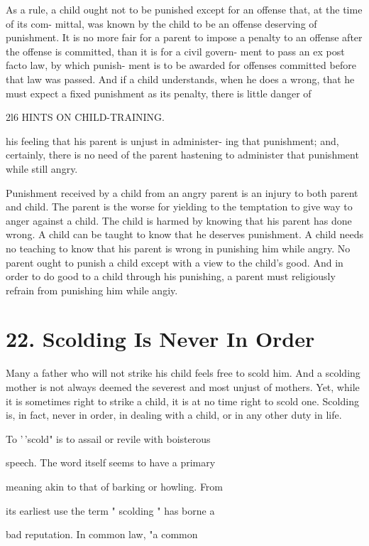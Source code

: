 \documentclass[
]{book}
\begin{document}
As a rule, a child ought not to be punished except for an offense that, at the time of its com- mittal, was known by the child to be an offense deserving of punishment. It is no more fair for a parent to impose a penalty to an offense after the offense is committed, than it is for a civil govern- ment to pass an ex post facto law, by which punish- ment is to be awarded for offenses committed before that law was passed. And if a child understands, when he does a wrong, that he must expect a fixed punishment as its penalty, there is little danger of

2l6 HINTS ON CHILD-TRAINING.

his feeling that his parent is unjust in administer- ing that punishment; and, certainly, there is no need of the parent hastening to administer that punishment while still angry.

Punishment received by a child from an angry parent is an injury to both parent and child. The parent is the worse for yielding to the temptation to give way to anger against a child. The child is harmed by knowing that his parent has done wrong. A child can be taught to know that he deserves punishment. A child needs no teaching to know that his parent is wrong in punishing him while angry. No parent ought to punish a child except with a view to the child's good. And in order to do good to a child through his punishing, a parent must religiously refrain from punishing him while angiy.

\hypertarget{scolding-is-never-in-order}{%
\chapter{22. Scolding Is Never In Order}\label{scolding-is-never-in-order}}

Many a father who will not strike his child feels free to scold him. And a scolding mother is not always deemed the severest and most unjust of mothers. Yet, while it is sometimes right to strike a child, it is at no time right to scold one. Scolding is, in fact, never in order, in dealing with a child, or in any other duty in life.

To '\,'scold" is to assail or revile with boisterous

speech. The word itself seems to have a primary

meaning akin to that of barking or howling. From

its earliest use the term " scolding " has borne a

bad reputation. In common law, "a common
\end{document}
